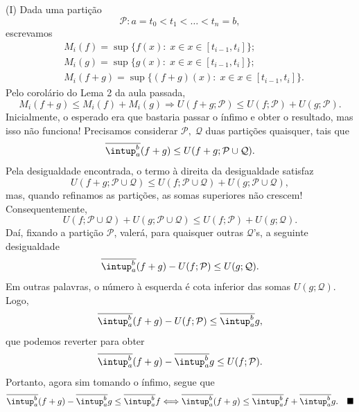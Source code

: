 \documentclass[../analysisII_notes.tex]{subfiles}
\begin{document}
\begin{proof*}
	(I) Dada uma partição
	\[
		\mathcal{P}: a = t_{0} < t_1 < \dotsc < t_{n} = b,
	\]
	escrevamos
	\begin{align*}
		 & M_{i}(f) = \sup_{}\{f(x):\;x\in x\in[t_{i-1}, t_{i}] \};       \\
		 & M_{i}(g) = \sup_{}\{g(x):\;x\in x\in[t_{i-1}, t_{i}] \};       \\
		 & M_{i}(f+g) = \sup_{}\{(f+g)(x):\;x\in x\in[t_{i-1}, t_{i}] \}.
	\end{align*}
	Pelo corolário do Lema 2 da aula passada,
	\[
		M_{i}(f+g)\leq M_{i}(f)+M_{i}(g) \Rightarrow U(f+g; \mathcal{P})\leq U(f; \mathcal{P}) + U(g; \mathcal{P}).
	\]
	Inicialmente, o esperado era que bastaria passar o ínfimo e obter o resultado, mas isso não funciona! Precisamos considerar \(\mathcal{P},\; \mathcal{Q}\) duas partições quaisquer, tais que
	\[
		\overline{\intup_{a}^{b}}(f+g)\leq U(f+g; \mathcal{P}\cup \mathcal{Q}).
	\]
	Pela desigualdade encontrada, o termo à direita da desigualdade satisfaz
	\[
		U(f+g; \mathcal{P}\cup \mathcal{Q})\leq U(f; \mathcal{P}\cup \mathcal{Q})+U(g; \mathcal{P}\cup \mathcal{Q}),
	\]
	mas, quando refinamos as partições, as somas superiores não crescem! Consequentemente,
	\[
		U(f; \mathcal{P}\cup \mathcal{Q})+U(g; \mathcal{P}\cup \mathcal{Q}) \leq U(f; \mathcal{P})+U(g; \mathcal{Q}).
	\]
	Daí, fixando a partição \(\mathcal{P}\), valerá, para quaisquer outras \(\mathcal{Q}\)'s, a seguinte desigualdade
	\[
		\overline{\intup_{a}^{b}}(f+g) - U(f; \mathcal{P})\leq U(g; \mathcal{Q}).
	\]
	Em outras palavras, o número à esquerda é cota inferior das somas \(U(g; \mathcal{Q})\). Logo,
	\[
		\overline{\intup_{a}^{b}}(f+g)-U(f; \mathcal{P})\leq \overline{\intup_{a}^{b}}g,
	\]
	que podemos reverter para obter
	\[
		\overline{\intup_{a}^{b}}(f+g)-\overline{\intup_{a}^{b}}g \leq U(f; \mathcal{P}).
	\]
	Portanto, agora sim tomando o ínfimo, segue que
	\[
		\overline{\intup_{a}^{b}}(f+g)-\overline{\intup_{a}^{b}}g \leq \overline{\intup_{a}^{b}}f \Longleftrightarrow \overline{\intup_{a}^{b}}(f+g)\leq \overline{\intup_{a}^{b}}f + \overline{\intup_{a}^{b}}g.\quad \text{\qedsymbol}
	\]
\end{proof*}
\end{document}

